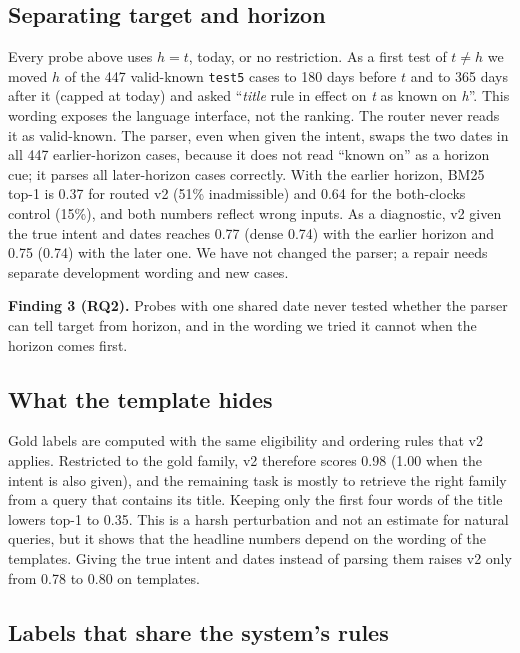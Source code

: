 \documentclass[11pt]{article}
\begin{document}
\subsection{Separating target and horizon}\label{sec:twodate}

Every probe above uses $h=t$, today, or no restriction. As a first test of $t\neq h$ we moved $h$ of the 447 valid-known \texttt{test5} cases to 180 days before $t$ and to 365 days after it (capped at today) and asked ``\textit{title} rule in effect on \textit{t} as known on \textit{h}''. This wording exposes the language interface, not the ranking. The router never reads it as valid-known. The parser, even when given the intent, swaps the two dates in all 447 earlier-horizon cases, because it does not read ``known on'' as a horizon cue; it parses all later-horizon cases correctly. With the earlier horizon, BM25 top-1 is 0.37 for routed v2 (51\% inadmissible) and 0.64 for the both-clocks control (15\%), and both numbers reflect wrong inputs. As a diagnostic, v2 given the true intent and dates reaches 0.77 (dense 0.74) with the earlier horizon and 0.75 (0.74) with the later one. We have not changed the parser; a repair needs separate development wording and new cases.

\textbf{Finding 3 (RQ2).} Probes with one shared date never tested whether the parser can tell target from horizon, and in the wording we tried it cannot when the horizon comes first.

\subsection{What the template hides}\label{sec:easy}

Gold labels are computed with the same eligibility and ordering rules that v2 applies. Restricted to the gold family, v2 therefore scores 0.98 (1.00 when the intent is also given), and the remaining task is mostly to retrieve the right family from a query that contains its title. Keeping only the first four words of the title lowers top-1 to 0.35. This is a harsh perturbation and not an estimate for natural queries, but it shows that the headline numbers depend on the wording of the templates. Giving the true intent and dates instead of parsing them raises v2 only from 0.78 to 0.80 on templates.

\subsection{Labels that share the system's rules}\label{sec:judge}
\end{document}
